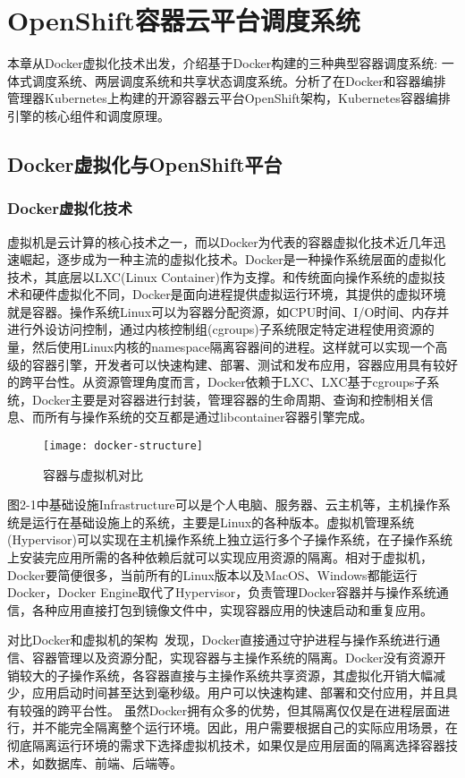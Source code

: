 \chapter{OpenShift容器云平台调度系统}
本章从Docker虚拟化技术出发，介绍基于Docker构建的三种典型容器调度系统: 一体式调度系统、两层调度系统和共享状态调度系统。分析了在Docker和容器编排管理器Kubernetes上构建的开源容器云平台OpenShift架构，Kubernetes容器编排引擎的核心组件和调度原理。

\section{Docker虚拟化与OpenShift平台}
\label{sec:first}
\subsection{Docker虚拟化技术}
虚拟机是云计算的核心技术之一，而以Docker为代表的容器虚拟化技术近几年迅速崛起，逐步成为一种主流的虚拟化技术。Docker是一种操作系统层面的虚拟化技术，其底层以LXC(Linux Container)作为支撑。和传统面向操作系统的虚拟技术和硬件虚拟化不同，Docker是面向进程提供虚拟运行环境，其提供的虚拟环境就是容器。操作系统Linux可以为容器分配资源，如CPU时间、I/O时间、内存并进行外设访问控制，通过内核控制组(cgroups)子系统限定特定进程使用资源的量，然后使用Linux内核的namespace隔离容器间的进程。这样就可以实现一个高级的容器引擎，开发者可以快速构建、部署、测试和发布应用，容器应用具有较好的跨平台性。从资源管理角度而言，Docker依赖于LXC、LXC基于cgroups子系统，Docker主要是对容器进行封装，管理容器的生命周期、查询和控制相关信息、而所有与操作系统的交互都是通过libcontainer容器引擎完成。
\begin{figure}[H] %
	\centering
	\texttt{[image: docker-structure]}
	\caption{容器与虚拟机对比}
\end{figure}
图2-1中基础设施Infrastructure可以是个人电脑、服务器、云主机等，主机操作系统是运行在基础设施上的系统，主要是Linux的各种版本。虚拟机管理系统(Hypervisor)可以实现在主机操作系统上独立运行多个子操作系统，在子操作系统上安装完应用所需的各种依赖后就可以实现应用资源的隔离。相对于虚拟机，Docker要简便很多，当前所有的Linux版本以及MacOS、Windows都能运行Docker，Docker Engine取代了Hypervisor，负责管理Docker容器并与操作系统通信，各种应用直接打包到镜像文件中，实现容器应用的快速启动和重复应用。

对比Docker和虚拟机的架构~\cite{Barik2017Performance, Felter2007An}发现，Docker直接通过守护进程与操作系统进行通信、容器管理以及资源分配，实现容器与主操作系统的隔离。Docker没有资源开销较大的子操作系统，各容器直接与主操作系统共享资源，其虚拟化开销大幅减少，应用启动时间甚至达到毫秒级。用户可以快速构建、部署和交付应用，并且具有较强的跨平台性。
虽然Docker拥有众多的优势，但其隔离仅仅是在进程层面进行，并不能完全隔离整个运行环境。因此，用户需要根据自己的实际应用场景，在彻底隔离运行环境的需求下选择虚拟机技术，如果仅是应用层面的隔离选择容器技术，如数据库、前端、后端等。
